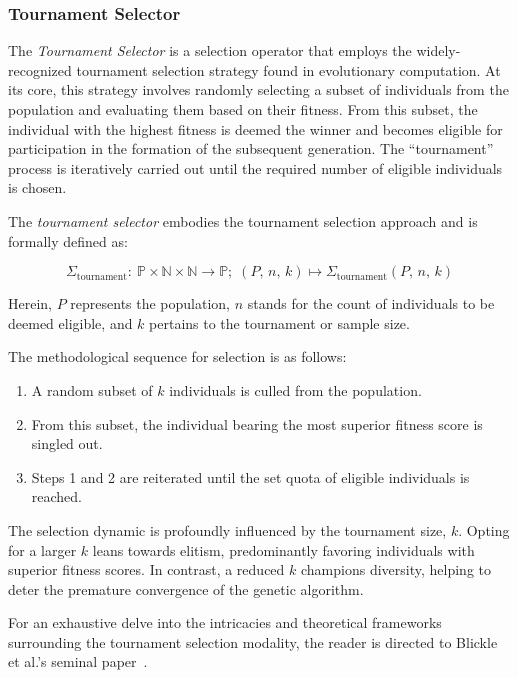 \subsubsection{Tournament Selector}
\label{sec:keen:operators:selection:tournament}
  The \emph{Tournament Selector} is a selection operator that employs the 
  widely-recognized tournament selection strategy found in evolutionary 
  computation.
  At its core, this strategy involves randomly selecting a subset of 
  individuals from the population and evaluating them based on their fitness. 
  From this subset, the individual with the highest fitness is deemed the 
  winner and becomes eligible for participation in the formation of the 
  subsequent generation.
  The \enquote{tournament} process is iteratively carried out until the 
  required number of eligible individuals is chosen.

  \begin{definition}
  \label{def:keen:op:select:tournament}
    The \emph{tournament selector} embodies the tournament selection approach 
    and is formally defined as:

    \begin{equation}
      \Sigma_\mathrm{tournament} :\: 
        \mathbb{P} \times \mathbb{N} \times \mathbb{N} \to \mathbb{P};\;
      (P,\, n,\, k) \mapsto \Sigma_\mathrm{tournament}(P,\, n,\, k)
    \end{equation}

    Herein, \(P\) represents the population, \(n\) stands for the count of 
    individuals to be deemed eligible, and \(k\) pertains to the tournament or 
    sample size.

    The methodological sequence for selection is as follows:

    \begin{enumerate}
      \item A random subset of \(k\) individuals is culled from the population.
      \item From this subset, the individual bearing the most superior fitness 
        score is singled out.
      \item Steps 1 and 2 are reiterated until the set quota of eligible 
        individuals is reached.
    \end{enumerate}
  \end{definition}

  \begin{remark}
    The selection dynamic is profoundly influenced by the tournament size, 
    \(k\).
    Opting for a larger \(k\) leans towards elitism, predominantly favoring 
    individuals with superior fitness scores.
    In contrast, a reduced \(k\) champions diversity, helping to deter the 
    premature convergence of the genetic algorithm.
  \end{remark}

  For an exhaustive delve into the intricacies and theoretical frameworks 
  surrounding the tournament selection modality, the reader is directed to 
  Blickle et al.'s seminal 
  paper~\autocite{blickleMathematicalAnalysisTournament1995}.
